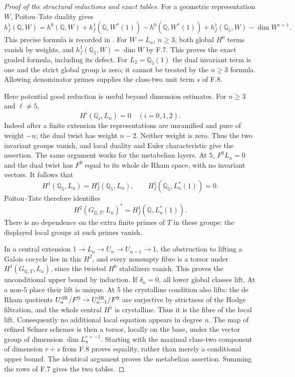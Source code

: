 \begin{proof}[Proof of the structural reductions and exact tables]
For a geometric representation $W$, Poitou--Tate duality gives
\[
 h_f^1(\mathbb Q,W)=h^0(\mathbb Q,W)
 +h_f^1(\mathbb Q,W^*(1))-h^0(\mathbb Q,W^*(1))
 +h_f^1(\mathbb Q_5,W)-\dim W^{c=1}.
\]
This precise formula is recorded in
\citet[(5.6)]{FE_LLM2023}. For $W=L_n$, $n\ge3$, both global
$H^0$ terms vanish by weights, and $h_f^1(\mathbb Q_5,W)=\dim W$
by F.7. This proves the exact graded formula, including its defect.
For $L_2=\mathbb Q_5(1)$ the dual invariant term is one and the strict
global group is zero; it cannot be treated by the $n\ge3$ formula.
Allowing denominator primes supplies the class-two unit term $s$ of F.8.

Here potential good reduction is useful beyond dimension estimates.
For $n\ge3$ and $\ell\ne5$,
\[
 H^i(\mathbb Q_\ell,L_n)=0\quad(i=0,1,2).
\]
Indeed after a finite extension the representations are unramified and
pure of weight $-n$; the dual twist has weight $n-2$. Neither weight
is zero. Thus the two invariant groups vanish, and local duality and
Euler characteristic give the assertion. The same argument works for
the metabelian layers. At $5$, $F^0L_n=0$ and the dual twist has
$F^0$ equal to its whole de Rham space, with no invariant vectors.
It follows that
\[
 H^1(\mathbb Q_5,L_n)=H_f^1(\mathbb Q_5,L_n),\qquad
 H_f^1(\mathbb Q_5,L_n^*(1))=0.
\]
Poitou--Tate therefore identifies
\[
 H^2(G_{\mathbb Q,T},L_n)^*
       =H_f^1(\mathbb Q,L_n^*(1)).
\]
There is no dependence on the extra finite primes of $T$ in these
groups: the displayed local groups at such primes vanish.

In a central extension
$1\to L_n\to U_n\to U_{n-1}\to1$, the obstruction to lifting a
Galois cocycle lies in this $H^2$, and every nonempty fibre is a
torsor under $H^1(G_{\mathbb Q,T},L_n)$, since the twisted $H^0$
stabilizers vanish. This proves the unconditional upper bound by
induction. If $\delta_n=0$, all lower global classes lift. At a
non-$5$ place their lift is unique. At $5$ the crystalline condition
also lifts: the de Rham quotients
$U_n^{\rm dR}/F^0\to U_{n-1}^{\rm dR}/F^0$ are surjective by
strictness of the Hodge filtration, and the whole central $H^1$ is
crystalline. Thus it is the fibre of the local lift.
Consequently no additional local equation appears in degree $n$.
The map of refined Selmer schemes is then a torsor, locally on the
base, under the vector group of dimension $\dim L_n^{c=-1}$.
Starting with the maximal class-two component of dimension $r+s$
from F.8 proves equality, rather than merely a conditional upper
bound. The identical argument proves the metabelian assertion.
Summing the rows of F.7 gives the two tables.


\end{proof}
